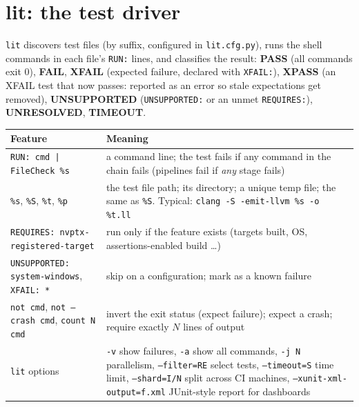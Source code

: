 \documentclass[10pt,a4paper,openany,oneside]{report}
\newcommand{\prio}[1]{\texorpdfstring{\ifcase#1\or{\color{gold}\ding{72}}\or{\color{gold}\ding{72}\ding{72}}\or{\color{gold}\ding{72}\ding{72}\ding{72}}\fi}{}}
\begin{document}
\section{lit: the test driver \prio{2}}
\begin{mustbox}
\texttt{lit} discovers test files (by suffix, configured in \texttt{lit.cfg.py}), runs the shell commands in each file's \texttt{RUN:} lines, and classifies the result:
\textbf{PASS} (all commands exit 0), \textbf{FAIL}, \textbf{XFAIL} (expected failure, declared with \texttt{XFAIL:}), \textbf{XPASS} (an XFAIL test that now passes: reported as an error so stale expectations get removed), \textbf{UNSUPPORTED} (\texttt{UNSUPPORTED:} or an unmet \texttt{REQUIRES:}), \textbf{UNRESOLVED}, \textbf{TIMEOUT}.
\end{mustbox}
\begin{center}\small
\begin{xltabular}{\textwidth}{@{}L{4.3cm}Y@{}}
\toprule
\textbf{Feature} & \textbf{Meaning}\\
\midrule\endhead
\texttt{RUN: cmd | FileCheck \%s} & a command line; the test fails if any command in the chain fails (pipelines fail if \emph{any} stage fails)\\
\texttt{\%s}, \texttt{\%S}, \texttt{\%t}, \texttt{\%p} & the test file path; its directory; a unique temp file; the same as \texttt{\%S}. Typical: \texttt{clang -S -emit-llvm \%s -o \%t.ll}\\
\texttt{REQUIRES: nvptx-registered-target} & run only if the feature exists (targets built, OS, assertions-enabled build \ldots)\\
\texttt{UNSUPPORTED: system-windows}, \texttt{XFAIL: *} & skip on a configuration; mark as a known failure\\
\texttt{not cmd}, \texttt{not --crash cmd}, \texttt{count N cmd} & invert the exit status (expect failure); expect a crash; require exactly $N$ lines of output\\
\texttt{lit} options & \texttt{-v} show failures, \texttt{-a} show all commands, \texttt{-j N} parallelism, \texttt{--filter=RE} select tests, \texttt{--timeout=S} time limit, \texttt{--shard=I/N} split across CI machines, \texttt{--xunit-xml-output=f.xml} JUnit-style report for dashboards\\
\bottomrule
\end{xltabular}
\end{center}
\end{document}
